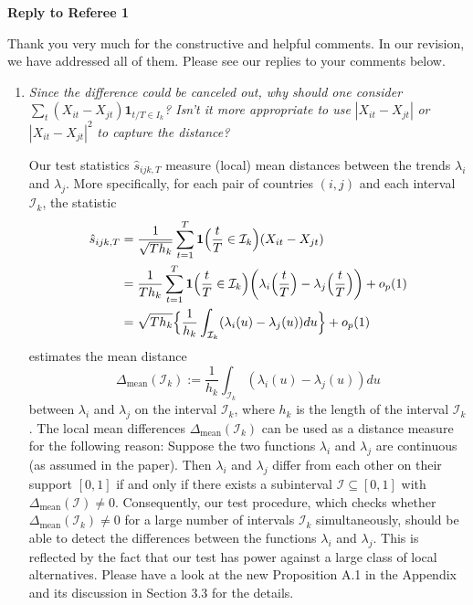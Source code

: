 \documentclass[a4paper,12pt]{article}
\begin{document}
\newpage
\begin{center}
{\large \bf Reply to Referee 1} 
\end{center}


Thank you very much for the constructive and helpful comments. In our revision, we have addressed all of them. Please see our replies to your comments below.


\begin{enumerate}[label=(\arabic*),leftmargin=0.7cm]


\item \textit{Since the difference could be canceled out, why should one consider} $\sum\nolimits_t (X_{it} - X_{jt})\mathbf{1}_{t/T \in I_k}$\textit{? Isn't it more appropriate to use} $|X_{it} - X_{jt}|$ \textit{ or } $|X_{it} - X_{jt}|^2$ \textit{to capture the distance?}

Our test statistics $\hat{s}_{ijk,T}$ measure (local) mean distances between the trends $\lambda_i$ and $\lambda_j$. More specifically, for each pair of countries $(i,j)$ and each interval $\mathcal{I}_k$, the statistic
\begin{align*} 
\hat{s}_{ijk,T} 
 & = \frac{1}{\sqrt{Th_k}} \sum\limits_{t=1}^T \boldsymbol{1}\Big(\frac{t}{T} \in \mathcal{I}_k\Big) (X_{it} - X_{jt}) \\
 & = \frac{1}{Th_k} \sum\limits_{t=1}^T \boldsymbol{1}\Big(\frac{t}{T} \in \mathcal{I}_k\Big) \bigg( \lambda_i \Big(\frac{t}{T}\Big)  - \lambda_j \Big(\frac{t}{T}\Big)\bigg) + o_p(1) \\
 & = \sqrt{Th_k} \Big\{ \frac{1}{h_k} \int_{\mathcal{I}_k} (\lambda_i(u) - \lambda_j(u)) du \Big\} + o_p(1) 
\end{align*}
estimates the mean distance 
\[ \Delta_{\text{mean}}(\mathcal{I}_k) := \frac{1}{h_k} \int_{\mathcal{I}_k} (\lambda_i(u) - \lambda_j(u)) du \]
between $\lambda_i$ and $\lambda_j$ on the interval $\mathcal{I}_k$, where $h_k$ is the length of the interval $\mathcal{I}_k$. The local mean differences $\Delta_{\text{mean}}(\mathcal{I}_k)$ can be used as a distance measure for the following reason: Suppose the two functions $\lambda_i$ and $\lambda_j$ are continuous (as assumed in the paper). Then $\lambda_i$ and $\lambda_j$ differ from each other on their support $[0,1]$ if and only if there exists a subinterval $\mathcal{I} \subseteq [0,1]$ with $\Delta_{\text{mean}}(\mathcal{I}) \ne 0$. Consequently, our test procedure, which checks whether $\Delta_{\text{mean}}(\mathcal{I}_k) \ne 0$ for a large number of intervals $\mathcal{I}_k$ simultaneously, should be able to detect the differences between the functions $\lambda_i$ and $\lambda_j$. This is reflected by the fact that our test has power against a large class of local alternatives. Please have a look at the new Proposition A.1 in the Appendix and its discussion in Section 3.3 for the details.


\end{enumerate}
\end{document}
